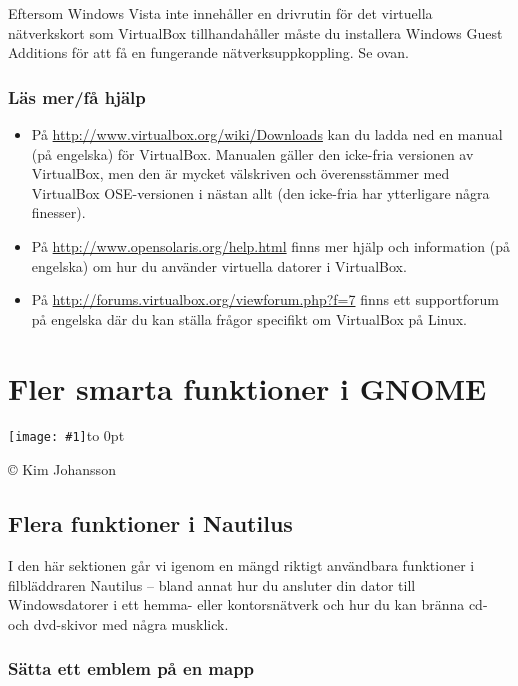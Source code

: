 \documentclass[a4paper,final]{memoir} %
\newcommand{\xrcredit}[1]{\hbox to 0pt{\hspace*{.6\baselineskip}\begin{rotate}{90}{\usefont{T1}{phv}{m}{n}\selectfont\tiny #1}\end{rotate}}}
\newcommand\xintropic[1]{{\texttt{[image: \#1]}\xrcredit{\copyright{} Kim Johansson}}\medskip}
\newcommand\xchapter[2]{\chapter{#2}\begin{center}\xintropic{#1}\end{center}}
\begin{document}
Eftersom Windows Vista inte innehåller en drivrutin för det virtuella nätverkskort som VirtualBox tillhandahåller måste du installera Windows Guest Additions för att få en fungerande nätverksuppkoppling. Se  ovan.

\subsection{Läs mer/få hjälp}

\begin{itemize}

\item På \url{http://www.virtualbox.org/wiki/Downloads} kan du ladda ned en manual (på engelska) för VirtualBox. Manualen gäller den icke-fria versionen av VirtualBox, men den är mycket välskriven och överensstämmer med VirtualBox OSE-versionen i nästan allt (den icke-fria har ytterligare några finesser).

\item På \url{http://www.opensolaris.org/help.html} finns mer hjälp och information (på engelska) om hur du använder virtuella datorer i VirtualBox.

\item På \url{http://forums.virtualbox.org/viewforum.php?f=7} finns ett supportforum på engelska där du kan ställa frågor specifikt om VirtualBox på Linux.

\end{itemize}




\xchapter{bilder804-all/Fler_Smarta_funktioner_i_Gnome}{Fler smarta funktioner i GNOME}\label{cha:referens}



\section{Flera funktioner i Nautilus}

I den här sektionen går vi igenom en mängd riktigt användbara funktioner i filbläddraren Nautilus -- bland annat hur du ansluter din dator till Windowsdatorer i ett hemma- eller kontorsnätverk och hur du kan bränna cd- och dvd-skivor med några musklick.

\subsection{Sätta ett emblem på en mapp}
\end{document}
